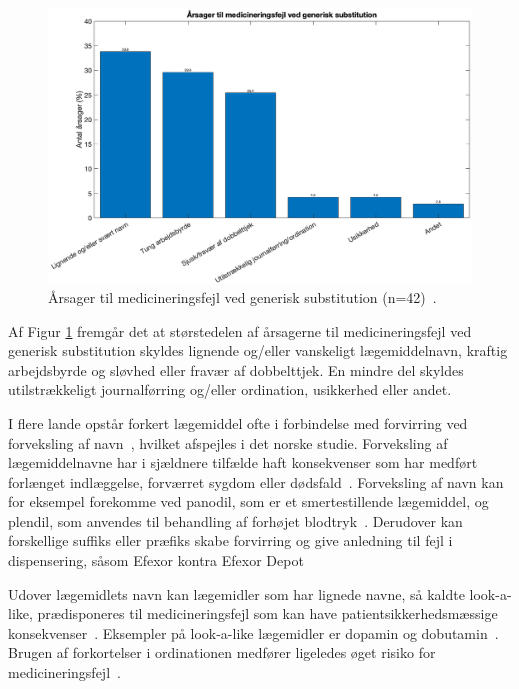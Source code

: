 \begin{figure}[H]\centering	\includegraphics[width=1\textwidth]{billeder/GenSub1.png} 
	\caption{Årsager til medicineringsfejl ved generisk substitution (n=42)~\citep{Hakonsen2010}.}	\label{fig:GeneriskSubstitution1}  
\end{figure}

Af Figur \ref{fig:GeneriskSubstitution1} fremgår det at størstedelen af årsagerne til medicineringsfejl ved generisk substitution skyldes lignende og/eller vanskeligt lægemiddelnavn, kraftig arbejdsbyrde og sløvhed eller fravær af dobbelttjek. En mindre del skyldes utilstrækkeligt journalførring og/eller ordination, usikkerhed eller andet. 

I flere lande opstår forkert lægemiddel ofte i forbindelse med forvirring ved forveksling af navn~\citep{DanskSelskabforPatientsikkerhed2009}, hvilket afspejles i det norske studie. Forveksling af lægemiddelnavne har i sjældnere tilfælde haft konsekvenser som har medført forlænget indlæggelse, forværret sygdom eller dødsfald~\citep{DanskSelskabforPatientsikkerhed2009}. Forveksling af navn kan for eksempel forekomme ved panodil, som er et smertestillende lægemiddel, og plendil, som anvendes til behandling af forhøjet blodtryk~\citep{DanskSelskabforPatientsikkerhed2009}. Derudover kan forskellige suffiks eller præfiks skabe forvirring og give anledning til fejl i dispensering, såsom Efexor kontra Efexor Depot~\citep{DanskSelskabforPatientsikkerhed2009} 

Udover lægemidlets navn kan lægemidler som har lignede navne, så kaldte look-a-like, prædisponeres til medicineringsfejl som kan have patientsikkerhedsmæssige konsekvenser~\citep{Wittich2014}. Eksempler på look-a-like lægemidler er  dopamin og dobutamin~\citep{Wittich2014}. Brugen af forkortelser i ordinationen medfører ligeledes øget risiko for medicineringsfejl~\citep{Wittich2014}.

